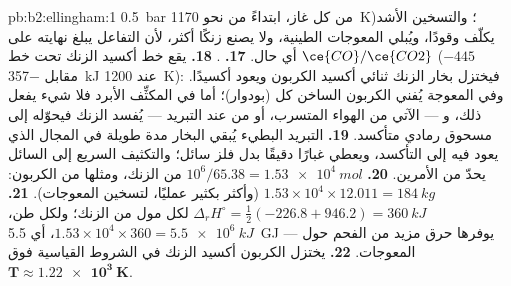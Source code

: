 \begin{solution}{pb:b2:ellingham:1}
\qty{0.5}{bar} من كل غاز، ابتداءً من نحو \qty{1170}{K})؛ والتسخين الأشد يكلّف وقودًا،
ويُبلي المعوجات الطينية، ولا يصنع زنكًا أكثر، لأن التفاعل يبلغ
نهايته على أي حال.
\textbf{17.} .
\textbf{18.} يقع خط أكسيد الزنك تحت خط $\ce{CO}/\ce{CO2}$
($-445$ مقابل \qty{-357}{kJ} عند \qty{1200}{K}): فيختزل بخار الزنك ثنائي أكسيد
الكربون ويعود أكسيدًا. وفي المعوجة يُفني الكربون الساخن كل
 (بودوار)؛ أما في المكثِّف الأبرد فلا شيء يفعل ذلك، و --- الآتي من
الهواء المتسرب، أو من  عند التبريد --- يُفسد الزنك فيحوّله إلى
مسحوق رمادي متأكسد.
\textbf{19.} التبريد البطيء يُبقي البخار مدة طويلة في المجال الذي
يعود فيه إلى التأكسد، ويعطي غبارًا دقيقًا بدل فلز سائل؛ والتكثيف
السريع إلى السائل يحدّ من الأمرين.
\textbf{20.} $10^6/65.38 = \qty{1.53e4}{mol}$ من الزنك، ومثلها من الكربون:
$1.53 \times 10^4 \times 12.011 = \qty{184}{kg}$ (وأكثر بكثير عمليًا، لتسخين
المعوجات).
\textbf{21.} $\Delta_r H^\circ = \frac12(-226.8 + 946.2) = \qty{+360}{kJ}$ لكل
مول من الزنك؛ ولكل طن، $1.53 \times 10^4 \times 360 = \qty{5.5e6}{kJ}$، أي
\qty{5.5}{GJ} --- يوفرها حرق مزيد من الفحم حول المعوجات.
\textbf{22.} يختزل الكربون أكسيد الزنك في الشروط القياسية فوق
$\boldsymbol{T \approx \qty{1.22e3}{K}}$.
\end{solution}
